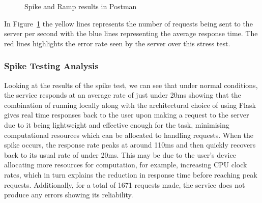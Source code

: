 \documentclass{surreydissertation}
\begin{document}
\begin{figure}
    \centering
    \caption{Spike and Ramp results in Postman}
    \label{fig:results}
    \end{figure}

In Figure~\ref{fig:results} the yellow lines represents the number of requests being sent to the server per second with the blue lines representing the average response time. The red lines highlights the error rate seen by the server over this stress test.

\subsubsection{Spike Testing Analysis}
Looking at the results of the spike test, we can see that under normal conditions, the service responds at an average rate of just under 20ms showing that the combination of running locally along with the architectural choice of using Flask gives real time responses back to the user upon making a request to the server due to it being lightweight and effective enough for the task, minimising computational resources which can be allocated to handling requests. When the spike occurs, the response rate peaks at around 110ms and then quickly recovers back to its usual rate of under 20ms. This may be due to the user’s device allocating more resources for computation, for example, increasing CPU clock rates, which in turn explains the reduction in response time before reaching peak requests. Additionally, for a total of 1671 requests made, the service does not produce any errors showing its reliability.
\end{document}
